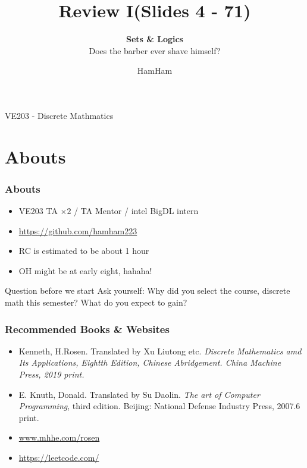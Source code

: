 \documentclass[xcolor=table]{beamer}
\title{\sffamily Review I(Slides 4 - 71)}
\subtitle{\textbf{Sets \& Logics}\\ Does the barber ever shave himself?}
\institute[UM-SJTU JI]{University of Michigan-Shanghai Jiao Tong University Joint Institute}
\author{HamHam}
\newcommand{\myfont}{\rmfamily\normalsize\upshape\mdseries}
\begin{document}
\begin{titlepage}
    \begin{center}
        VE203 - Discrete Mathmatics 
    \end{center}
\end{titlepage}
\myfont

\section{Abouts}
\begin{frame}
    \frametitle{Abouts}

    \begin{itemize}
        \item VE203 TA $\times 2$ / TA Mentor / intel BigDL intern
        \item \url{https://github.com/hamham223}
        \item RC is estimated to be about 1 hour
        \item OH might be at early eight, hahaha!
    \end{itemize}
    
    \vspace{2em}

    \begin{block}{Question before we start}
        \hspace{2em}
        Ask yourself: Why did you select the course, discrete math this semester? What do you expect to gain? 
    \end{block}

\end{frame}

\begin{frame}
    \frametitle{Recommended Books \& Websites}
    \begin{itemize}
        \item Kenneth, H.Rosen. Translated by Xu Liutong etc. \itshape Discrete Mathematics amd Its Applications\myfont, 
        Eightth Edition, Chinese Abridgement. China Machine Press, 2019 print.
        \item E. Knuth, Donald. Translated by Su Daolin. \textit{The art of Computer Programming}, third edition.
        Beijing: National Defense Industry Press, 2007.6 print.
        \item \url{www.mhhe.com/rosen}
        \item \url{https://leetcode.com/}
    \end{itemize}

\end{frame}
\end{document}
